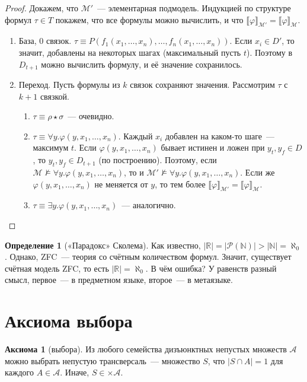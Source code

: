 \documentclass[a4paper,11pt]{article}
\theoremstyle{definition}
\newtheorem*{axm}{Аксиома}
\newtheorem*{dfn}{Определение}
\begin{document}
\begin{proof}
Докажем, что $\mathcal{M}'$~--- элементарная подмодель. Индукцией по структуре
формул $\tau \in T$ покажем, что все формулы можно вычислить, и что
$\llbracket\varphi\rrbracket_{\mathcal{M}'} = \llbracket\varphi\rrbracket_{\mathcal{M}}$.
\begin{enumerate}
\item База, 0 связок. $\tau \equiv P(f_1(x_1, \dots, x_n), \dots, f_{n}(x_1,
  \dots, x_n))$. Если $x_i \in D'$, то значит, добавлены на некоторых шагах
  (максимальный пусть $t$). Поэтому в $D_{t+1}$ можно вычислить формулу, и её
  значение сохранилось.
\item Переход. Пусть формулы из $k$ связок сохраняют значения. Рассмотрим
  $\tau$ с $k+1$ связкой.
  \begin{enumerate}
  \item $\tau \equiv \rho \star \sigma$~--- очевидно.
  \item $\tau \equiv \forall y.\varphi(y, x_1, \dots, x_n)$. Каждый $x_i$ добавлен
    на каком-то шаге~--- максимум $t$. Если $\varphi(y, x_1, \dots, x_n)$
    бывает истинен и ложен при $y_t, y_f \in D$, то $y_t, y_f \in D_{t+1}$ (по
    построению). Поэтому, если $\mathcal{M} \not\models \forall y.\varphi(y,
    x_1, \dots, x_n)$, то и $\mathcal{M}' \not\models \forall y.\varphi(y, x_1,
    \dots, x_n)$. Если же $\varphi(y, x_1, \dots, x_n)$ не меняется от $y$, то
    тем более $\llbracket\varphi\rrbracket_{\mathcal{M}'} =
    \llbracket\varphi\rrbracket_{\mathcal{M}}$.
  \item $\tau \equiv \exists y.\varphi(y, x_1, \dots, x_n)$~--- аналогично.
  \end{enumerate}
\end{enumerate}
\end{proof}

\begin{dfn}[«Парадокс» Сколема]
Как известно, $|\mathbb{R}| = |\mathcal{P}(\mathbb{N})| > |\mathbb{N}| =
\aleph_0$. Однако, ZFC~--- теория со счётным количеством формул. Значит,
существует счётная модель ZFC, то есть $|\mathbb{R}| = \aleph_0$. В чём ошибка?
У равенств разный смысл, первое~--- в предметном языке, второе~--- в метаязыке.
\end{dfn}

\section{Аксиома выбора}
\begin{axm}[выбора]
Из любого семейства дизъюнктных непустых множеств $\mathcal{A}$ можно выбрать
непустую трансверсаль~--- множество $S$, что $|S \cap A| = 1$ для каждого $A \in
\mathcal{A}$. Иначе, $S \in \times\mathcal{A}$.
\end{axm}
\end{document}
